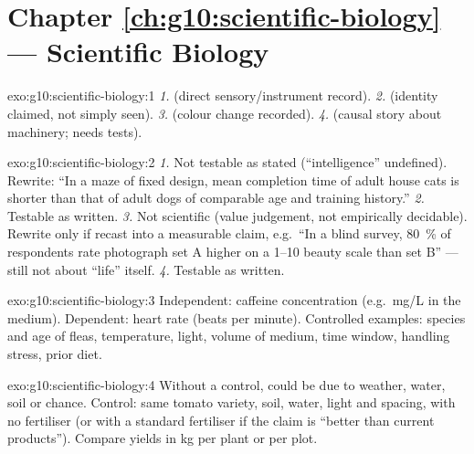 \section*{Chapter \ref{ch:g10:scientific-biology} --- Scientific Biology}

\begin{solution}{exo:g10:scientific-biology:1}
\emph{1.}  (direct sensory/instrument record).
\emph{2.}  (identity claimed, not simply seen).
\emph{3.}  (colour change recorded).
\emph{4.}  (causal story about machinery; needs tests).
\end{solution}

\begin{solution}{exo:g10:scientific-biology:2}
\emph{1.} Not testable as stated (``intelligence'' undefined). Rewrite:
``In a maze of fixed design, mean completion time of adult house cats is
shorter than that of adult dogs of comparable age and training history.''
\emph{2.} Testable as written.
\emph{3.} Not scientific (value judgement, not empirically decidable).
Rewrite only if recast into a measurable claim, e.g.\ ``In a blind survey,
\qty{80}{\percent} of respondents rate photograph set A higher on a 1--10
beauty scale than set B'' --- still not about ``life'' itself.
\emph{4.} Testable as written.
\end{solution}

\begin{solution}{exo:g10:scientific-biology:3}
Independent: caffeine concentration (e.g.\ \unit{mg/L} in the medium).
Dependent: heart rate (beats per minute). Controlled examples: species
and age of fleas, temperature, light, volume of medium,  time
window, handling stress, prior diet.
\end{solution}

\begin{solution}{exo:g10:scientific-biology:4}
Without a control,  could be due to weather, water, soil or chance.
Control: same tomato variety, soil, water, light and spacing, with no
fertiliser (or with a standard fertiliser if the claim is ``better than
current products''). Compare yields in \unit{kg} per plant or per plot.
\end{solution}

